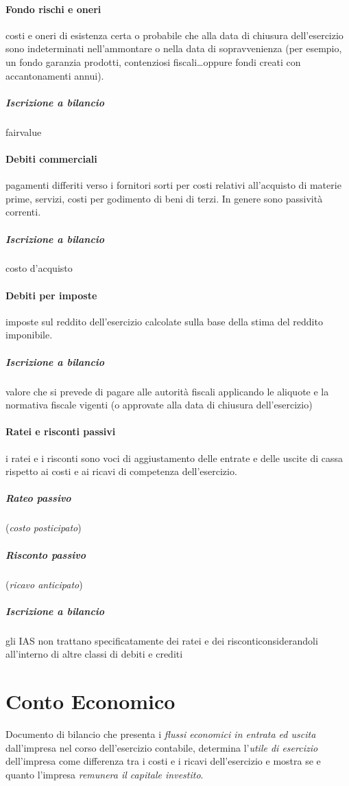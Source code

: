 \documentclass[10pt,a4paper,fleqn,oneside]{book}
\begin{document}
\paragraph{Fondo rischi e oneri} costi e oneri di esistenza certa o probabile che
alla data di chiusura dell’esercizio sono indeterminati nell’ammontare o nella data
di sopravvenienza (per esempio, un fondo  garanzia prodotti, contenziosi fiscali\dots oppure
fondi creati con accantonamenti annui).
\subparagraph{Iscrizione a bilancio} \gls{fairvalue}

\paragraph{Debiti commerciali} pagamenti differiti verso i fornitori sorti per costi
relativi all’acquisto di materie prime, servizi, costi per godimento di beni di terzi.
In genere sono passività correnti.
\subparagraph{Iscrizione a bilancio} costo d'acquisto

\paragraph{Debiti per imposte} imposte sul reddito dell’esercizio calcolate sulla
base della stima del reddito imponibile.
\subparagraph{Iscrizione a bilancio} valore che si prevede di pagare alle autorità
fiscali applicando le aliquote e la normativa fiscale vigenti (o approvate alla
data di chiusura dell’esercizio)

\paragraph{Ratei e risconti passivi} i ratei e i risconti sono voci di aggiustamento
delle entrate e delle uscite di cassa rispetto ai costi e ai ricavi di competenza dell’esercizio.
\subparagraph{Rateo passivo} (\emph{costo posticipato})
\subparagraph{Risconto passivo} (\emph{ricavo anticipato})
\subparagraph{Iscrizione a bilancio} gli IAS non trattano specificatamente dei ratei
e dei risconticonsiderandoli all'interno di altre classi di debiti e crediti

\section{Conto Economico}
Documento di bilancio che presenta i \emph{flussi economici in entrata ed uscita} dall’impresa nel corso
dell’esercizio contabile, determina l’\emph{utile di esercizio} dell’impresa come differenza tra i costi e i
ricavi dell’esercizio e mostra se e quanto l’impresa \emph{remunera il capitale investito}.
\end{document}
